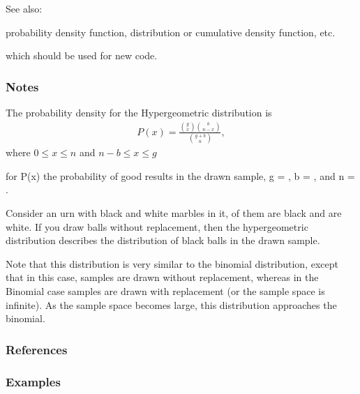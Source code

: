 \documentclass[letterpaper,10pt,english]{sphinxmanual}
\begin{document}
\begin{fulllineitems}
\begin{sphinxseealso}{See also:}
\begin{description}
\sphinxAtStartPar
probability density function, distribution or cumulative density function, etc.

\sphinxAtStartPar
which should be used for new code.

\end{description}


\end{sphinxseealso}

\subsubsection*{Notes}

\sphinxAtStartPar
The probability density for the Hypergeometric distribution is
\begin{equation*}
\begin{split}P(x) = \frac{\binom{g}{x}\binom{b}{n-x}}{\binom{g+b}{n}},\end{split}
\end{equation*}
\sphinxAtStartPar
where \(0 \le x \le n\) and \(n-b \le x \le g\)

\sphinxAtStartPar
for P(x) the probability of  good results in the drawn sample,
g = , b = , and n = .

\sphinxAtStartPar
Consider an urn with black and white marbles in it,  of them
are black and  are white. If you draw  balls without
replacement, then the hypergeometric distribution describes the
distribution of black balls in the drawn sample.

\sphinxAtStartPar
Note that this distribution is very similar to the binomial
distribution, except that in this case, samples are drawn without
replacement, whereas in the Binomial case samples are drawn with
replacement (or the sample space is infinite). As the sample space
becomes large, this distribution approaches the binomial.
\subsubsection*{References}
\subsubsection*{Examples}


\end{fulllineitems}
\end{document}
